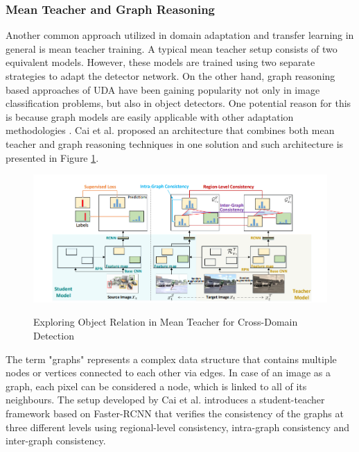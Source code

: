\documentclass[english, 12pt, a4paper, elec, utf8, a-1b, online]{aaltothesis}
\begin{document}
\subsubsection{Mean Teacher and Graph Reasoning}
\label{mean_teacher} 
Another common approach utilized in domain adaptation and transfer learning in general is mean teacher training. A typical mean teacher setup consists of two equivalent models. However, these models are trained using two separate strategies to adapt the detector network. On the other hand, graph reasoning based approaches of UDA have been gaining popularity not only in image classification problems, but also in object detectors. One potential reason for this is because graph models are easily applicable with other adaptation methodologies \cite{Oza2021}. Cai et al. \cite{Cai2019} proposed an architecture that combines both mean teacher and graph reasoning techniques in one solution and such architecture is presented in Figure \ref{graph_MT}. 
 
\begin{figure}[htb]
	\begin{center}
		\includegraphics[width=16cm]{./graph_teacher.png}
	\end{center}
	\caption{Exploring Object Relation in Mean Teacher for Cross-Domain Detection\cite{Cai2019}}
	\begin{center}
		\label{graph_MT}
	\end{center}
\end{figure}
\FloatBarrier

The term "graphs" represents a complex data structure that contains multiple nodes or vertices connected to each other via edges. In case of an image as a graph, each pixel can be considered a node, which is linked to all of its neighbours. 
The setup developed by Cai et al. \cite{Cai2019} introduces a student-teacher framework based on Faster-RCNN that verifies the consistency of the graphs at three different levels using regional-level consistency, intra-graph consistency and inter-graph consistency. 
\end{document}
